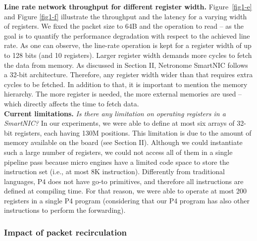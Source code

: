 \noindent \textbf{Line rate network throughput for different register width.} Figure~\ref{fig1-e} and Figure \ref{fig1-f} illustrate the throughput and the latency for a varying width of registers. We fixed the packet size to 64B and the operation to read -- as the goal is to quantify the performance degradation with respect to the achieved line rate. As one can observe, the line-rate operation is kept for a register width of up to 128 bits (and 10 registers). Larger register width demands more cycles to fetch the data from memory. As discussed in Section II, Netronome SmartNIC follows a 32-bit architecture. Therefore, any register width wider than that requires extra cycles to be fetched. In addition to that, it is important to mention the memory hierarchy. The more register is needed, the more external memories are used -- which directly affects the time to fetch data. \\

\noindent \textbf{Current limitations.} \emph{Is there any limitation on operating registers in a SmartNIC?} In our experiments, we were able to define at most six arrays of 32-bit registers, each having 130M positions. This limitation is due to the amount of memory available on the board (see Section II). Although we could instantiate such a large number of registers, we could not access all of them in a single pipeline pass because micro engines have a limited code space to store the instruction set (i.e., at most 8K instruction). Differently from traditional languages, P4 does not have go-to primitives, and therefore all instructions are defined at compiling time. For that reason, we were able to operate at most 200 registers in a single P4 program (considering that our P4 program has also other instructions to perform the forwarding). 



\subsubsection{Impact of packet recirculation}

